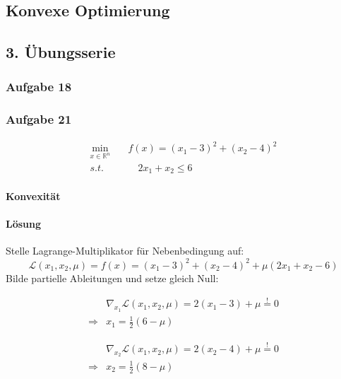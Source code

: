 \documentclass{article}
\begin{document}
\begin{center}
	\section*{Konvexe Optimierung}
	\subsection*{3. Übungsserie}
\end{center}

\subsubsection*{Aufgabe 18}
\subsubsection*{Aufgabe 21}

\begin{equation*}
    \begin{split}
     \min\limits_{x \in \mathbb{R}^n} &\quad f(x) = (x_1 - 3)^2 + (x_2 -4)^2\\
    s.t. &\quad \quad 2x_1 + x_2 \leq 6  
\end{split}
\end{equation*}

\paragraph{Konvexität}
\paragraph{Lösung}
Stelle Lagrange-Multiplikator für Nebenbedingung auf:
\begin{equation*}
    \mathcal{L}(x_1,x_2,\mu) = f(x) = (x_1 - 3)^2 + (x_2 -4)^2 + \mu(2x_1 + x_2 - 6 )
\end{equation*}
Bilde partielle Ableitungen und setze gleich Null:

\begin{equation}\label{dx1}
\begin{aligned}
            &\nabla_{x_1}\mathcal{L}(x_1,x_2,\mu) = 2(x_1-3)+\mu \overset{!}{=} 0 \\
        \Rightarrow& x_1 = \frac{1}{2}(6-\mu)
\end{aligned}
\end{equation}

\begin{equation}\label{dx2}
\begin{aligned}
    &\nabla_{x_2}\mathcal{L}(x_1,x_2,\mu) = 2(x_2-4)+\mu \overset{!}{=} 0 \\
    \Rightarrow& x_2 = \frac{1}{2}(8-\mu)
\end{aligned}
\end{equation}
\end{document}
